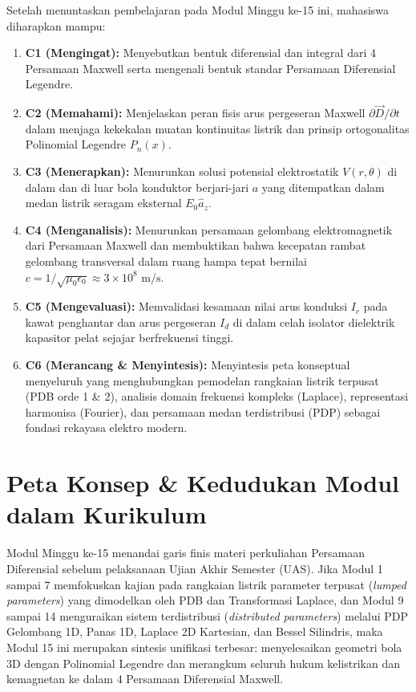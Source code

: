 \documentclass[11pt,a4paper]{article}
\theoremstyle{definition}
\begin{document}
\begin{subcpmkbox}
Setelah menuntaskan pembelajaran pada Modul Minggu ke-15 ini, mahasiswa diharapkan mampu:
\begin{enumerate}[leftmargin=*]
    \item \textbf{C1 (Mengingat):} Menyebutkan bentuk diferensial dan integral dari 4 Persamaan Maxwell serta mengenali bentuk standar Persamaan Diferensial Legendre.
    \item \textbf{C2 (Memahami):} Menjelaskan peran fisis arus pergeseran Maxwell $\partial \vec{D}/\partial t$ dalam menjaga kekekalan muatan kontinuitas listrik dan prinsip ortogonalitas Polinomial Legendre $P_n(x)$.
    \item \textbf{C3 (Menerapkan):} Menurunkan solusi potensial elektrostatik $V(r, \theta)$ di dalam dan di luar bola konduktor berjari-jari $a$ yang ditempatkan dalam medan listrik seragam eksternal $E_0 \hat{a}_z$.
    \item \textbf{C4 (Menganalisis):} Menurunkan persamaan gelombang elektromagnetik dari Persamaan Maxwell dan membuktikan bahwa kecepatan rambat gelombang transversal dalam ruang hampa tepat bernilai $c = 1/\sqrt{\mu_0 \epsilon_0} \approx 3 \times 10^8\text{ m/s}$.
    \item \textbf{C5 (Mengevaluasi):} Memvalidasi kesamaan nilai arus konduksi $I_c$ pada kawat penghantar dan arus pergeseran $I_d$ di dalam celah isolator dielektrik kapasitor pelat sejajar berfrekuensi tinggi.
    \item \textbf{C6 (Merancang \& Menyintesis):} Menyintesis peta konseptual menyeluruh yang menghubungkan pemodelan rangkaian listrik terpusat (PDB orde 1 \& 2), analisis domain frekuensi kompleks (Laplace), representasi harmonisa (Fourier), dan persamaan medan terdistribusi (PDP) sebagai fondasi rekayasa elektro modern.
\end{enumerate}
\end{subcpmkbox}

\section{Peta Konsep \& Kedudukan Modul dalam Kurikulum}

Modul Minggu ke-15 menandai garis finis materi perkuliahan Persamaan Diferensial sebelum pelaksanaan Ujian Akhir Semester (UAS). Jika Modul 1 sampai 7 memfokuskan kajian pada rangkaian listrik parameter terpusat (\textit{lumped parameters}) yang dimodelkan oleh PDB dan Transformasi Laplace, dan Modul 9 sampai 14 menguraikan sistem terdistribusi (\textit{distributed parameters}) melalui PDP Gelombang 1D, Panas 1D, Laplace 2D Kartesian, dan Bessel Silindris, maka Modul 15 ini merupakan sintesis unifikasi terbesar: menyelesaikan geometri bola 3D dengan Polinomial Legendre dan merangkum seluruh hukum kelistrikan dan kemagnetan ke dalam 4 Persamaan Diferensial Maxwell.
\end{document}
